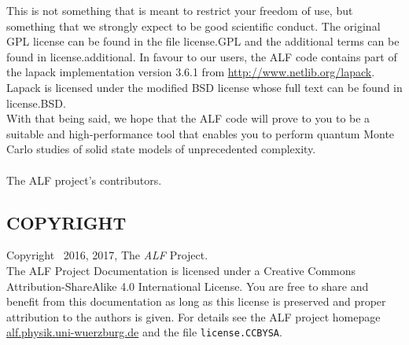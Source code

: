 This is not something that is meant to restrict your freedom of use, but something that we strongly expect to be good scientific conduct.
The original GPL license can be found in the file license.GPL and the additional terms can be found in license.additional.
In favour to our users, the ALF code contains part of the lapack implementation version 3.6.1 from \url{http://www.netlib.org/lapack}.
Lapack is licensed under the modified BSD license whose full text can be found in license.BSD.\\
With that being said, we hope that the ALF code will prove to you to be a suitable and high-performance tool that enables
you to perform quantum Monte Carlo studies of solid state models of unprecedented complexity.\\
\\
The ALF project's contributors.\\
                        
\subsection*{COPYRIGHT}

Copyright \textcopyright ~2016, 2017, The \textit{ALF} Project.\\
The ALF Project Documentation 
is licensed under a Creative Commons Attribution-ShareAlike 4.0 International License.
You are free to share and benefit from this documentation as long as this license is preserved
and proper attribution to the authors is given. For details see the ALF project
homepage \url{alf.physik.uni-wuerzburg.de} and the file \texttt{license.CCBYSA}.
